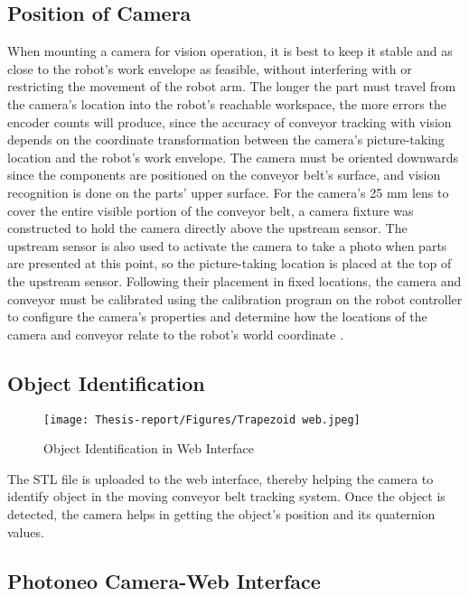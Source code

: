 \documentclass[12pt]{article}
\begin{document}
\subsection{Position of Camera}
When mounting a camera for vision operation, it is best to keep it stable and as close to the robot's work envelope as feasible, without interfering with or restricting the movement of the robot arm. The longer the part must travel from the camera's location into the robot's reachable workspace, the more errors the encoder counts will produce, since the accuracy of conveyor tracking with vision depends on the coordinate transformation between the camera's picture-taking location and the robot's work envelope. The camera must be oriented downwards since the components are positioned on the conveyor belt's surface, and vision recognition is done on the parts' upper surface. For the camera's 25 mm lens to cover the entire visible portion of the conveyor belt, a camera fixture was constructed to hold the camera directly above the upstream sensor. The upstream sensor is also used to activate the camera to take a photo when parts are presented at this point, so the picture-taking location is placed at the top of the upstream sensor. Following their placement in fixed locations, the camera and conveyor must be calibrated using the calibration program on the robot controller to configure the camera's properties and determine how the locations of the camera and conveyor relate to the robot's world coordinate \cite{ref19}.\

\subsection{Object Identification}
\begin{figure}[h]
    \centering
    \texttt{[image: Thesis-report/Figures/Trapezoid web.jpeg]}
    \caption{Object Identification in Web Interface}
    \label{fig:web_interface}
\end{figure}


The STL file is uploaded to the web interface, thereby helping the camera to identify object in the moving conveyor belt tracking system. Once the object is detected, the camera helps in getting the object's position and its quaternion values.

\subsection{Photoneo Camera-Web Interface}
\end{document}
